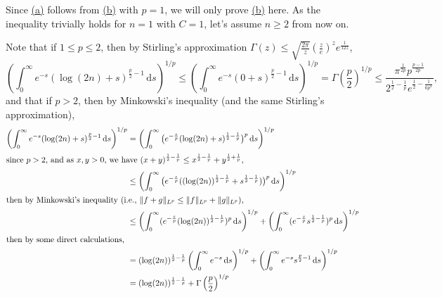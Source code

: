 \begin{answer}
	Since \hyperref[ex5.4.13:a]{(a)} follows from \hyperref[ex5.4.13:b]{(b)} with \(p=1\), we will only prove \hyperref[ex5.4.13:b]{(b)} here. As the inequality trivially holds for \(n=1\) with \(C=1\), let's assume \(n\geq 2\) from now on.

	Note that if \(1 \leq p \leq 2\), then by Stirling's approximation \(\Gamma(z) \leq \sqrt{\frac{2\pi}{z}} \left( \frac{z}{e} \right)^{z} e^{\frac{1}{12z}}\),
	\[
		\left( \int_{0}^{\infty} e^{-s}(\log(2n)+s)^{\frac{p}{2} - 1}\,\mathrm{d} s \right) ^{1 / p}
		\leq \left( \int_{0}^{\infty} e^{-s}(0+s)^{\frac{p}{2} - 1}\,\mathrm{d} s \right) ^{1 / p}
		= \Gamma \left( \frac{p}{2} \right) ^{1 / p}
		\leq \frac{\pi^{\frac{1}{2p}} p^{\frac{p-1}{2p}}}{2^{\frac{1}{2} - \frac{1}{p}} e^{\frac{1}{2} - \frac{1}{6 p^2}}},
	\]
	and that if \(p>2\), then by Minkowski's inequality (and the same Stirling's approximation),
	\begin{align*}
		\left( \int_{0}^{\infty} e^{-s}(\log(2n)+s)^{\frac p2-1}\,\mathrm{d} s \right)^{1 / p}
		 & =\left( \int_{0}^{\infty} \big( e^{-\frac{s}{p}} (\log(2n)+s)^{\frac{1}{2} - \frac{1}{p}}\big)^{p} \,\mathrm{d} s \right)^{1 / p}                                                                                                    \\
		\shortintertext{since \(p > 2\), and as \(x, y > 0\), we have \((x + y)^{\frac{1}{2} - \frac{1}{p}}\leq x^{\frac{1}{2} - \frac{1}{p}} + y^{\frac{1}{2} + \frac{1}{p}}\),}
		 & \leq \left( \int_{0}^{\infty} \big( e^{-\frac{s}{p}} ((\log(2n))^{\frac{1}{2} - \frac{1}{p}} + s^{\frac{1}{2} - \frac{1}{p}}) \big)^{p} \,\mathrm{d} s \right) ^{1 / p}                                                              \\
		\shortintertext{then by Minkowski's inequality (i.e., \(\lVert f + g \rVert _{L^p} \leq \lVert f \rVert _{L^p} + \lVert g \rVert _{L^p}\)),}
		 & \leq \left( \int_{0}^{\infty} (e^{-\frac{s}{p}}(\log(2n))^{\frac{1}{2}-\frac{1}{p}})^p \,\mathrm{d} s \right)^{1 / p} + \left( \int_{0}^{\infty} (e^{-\frac{s}{p}} s^{\frac{1}{2} - \frac{1}{p}})^{p} \,\mathrm{d} s \right)^{1 / p} \\
		\shortintertext{then by some direct calculations,}
		 & = (\log(2n))^{\frac{1}{2} - \frac{1}{p}} \left( \int_{0}^{\infty} e^{-s} \,\mathrm{d} s \right)^{1 / p} + \left( \int_{0}^{\infty} e^{-s} s^{\frac{p}{2} - 1} \,\mathrm{d} s \right)^{1 / p}                                         \\
		 & = (\log(2n))^{\frac{1}{2} - \frac{1}{p}} + \Gamma\left( \frac{p}{2} \right) ^{1 / p}                                                                                                                                                 \\

\end{align*}
\end{answer}
